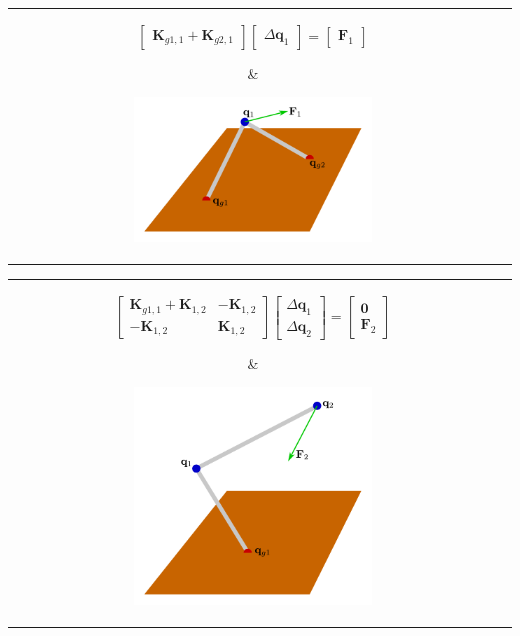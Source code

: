 \documentclass{article}
\begin{document}
\begin{tabular}{cc}  
\parbox{0.5\textwidth}{
\[\begin{bmatrix} 
\mathbf{K}_{g1,1} + \mathbf{K}_{g2,1}
\end{bmatrix}\begin{bmatrix} 
\Delta\mathbf{q}_1
\end{bmatrix} = \begin{bmatrix}
\mathbf{F}_1
\end{bmatrix}\]
} & \parbox{0.5\textwidth}{
\includegraphics[width = 0.5\textwidth]{elastic_mesh_example_2}
}
\end{tabular}




\begin{tabular}{cc}  
\parbox{0.5\textwidth}{
\[\begin{bmatrix} 
\mathbf{K}_{g1,1} + \mathbf{K}_{1,2} & -\mathbf{K}_{1,2} \\ 
-\mathbf{K}_{1,2} & \mathbf{K}_{1,2}
\end{bmatrix}\begin{bmatrix} 
\Delta\mathbf{q}_1 \\ 
\Delta\mathbf{q}_2
\end{bmatrix} = \begin{bmatrix}
\mathbf{0} \\ 
\mathbf{F}_2 
\end{bmatrix}\]
} & \parbox{0.5\textwidth}{
\includegraphics[width = 0.5\textwidth]{elastic_mesh_example_3}
}
\end{tabular}
\end{document}
